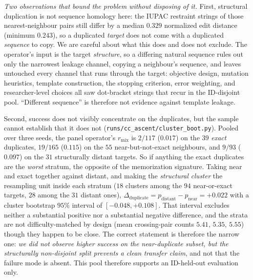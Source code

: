 \documentclass[11pt]{article}
\begin{document}
\smallskip\noindent\emph{Two observations that bound the problem without disposing of it.} First, structural
duplication is not sequence homology here: the IUPAC restraint strings of those nearest-neighbour pairs still
differ by a median $0.329$ normalized edit distance (minimum $0.243$), so a duplicated \emph{target} does not
come with a duplicated \emph{sequence} to copy. We are careful about what this does and does not exclude. The
operator's input is the target \emph{structure}, so a differing natural sequence rules out only the narrowest leakage channel, copying a neighbour's sequence, and leaves untouched every channel that runs through the
target: objective design, mutation heuristics, template construction, the stopping criterion, error weighting,
and researcher-level choices all saw dot-bracket strings that recur in the ID-disjoint pool. ``Different
sequence'' is therefore not evidence against template leakage.

\smallskip\noindent Second, success does not visibly concentrate on the duplicates, but the sample cannot
establish that it does not (\texttt{runs/cc\_ascent/cluster\_boot.py}). Pooled over three seeds, the panel
operator's $r_{\mathrm{mix}}$ is $2/117$ ($0.017$) on the $39$ \emph{exact} duplicates, $19/165$ ($0.115$) on
the $55$ near-but-not-exact neighbours, and $9/93$ ($0.097$) on the $31$ structurally distant targets. So if
anything the exact duplicates are the \emph{worst} stratum, the opposite of the memorization signature. Taking
near and exact together against distant, and making the \emph{structural cluster} the resampling unit inside
each stratum ($18$ clusters among the $94$ near-or-exact targets, $28$ among the $31$ distant ones),
$\Delta_{\mathrm{duplicate}}=p_{\mathrm{distant}}-p_{\mathrm{near}}={+}0.022$ with a cluster bootstrap $95\%$
interval of $[{-}0.048,{+}0.108]$. That interval excludes neither a substantial positive nor a substantial
negative difference, and the strata are not difficulty-matched by design (mean crossing-pair counts $5.41$,
$5.35$, $5.55$) though they happen to be close. The correct statement is therefore the narrow one: \emph{we did
not observe higher success on the near-duplicate subset, but the structurally non-disjoint split prevents a
clean transfer claim}, and not that the failure mode is absent. This pool therefore supports an ID-held-out
evaluation only.
\end{document}
